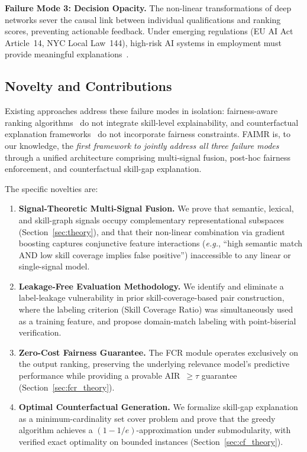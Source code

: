 \documentclass{svproc}
\begin{document}
\textbf{Failure Mode 3: Decision Opacity.} The non-linear transformations of deep networks sever the causal link between individual qualifications and ranking scores, preventing actionable feedback. Under emerging regulations (EU AI Act Article~14, NYC Local Law~144), high-risk AI systems in employment must provide meaningful explanations~\cite{wachter2017counterfactual}.

\subsection{Novelty and Contributions}

Existing approaches address these failure modes in isolation: fairness-aware ranking algorithms~\cite{zehlike2017fa} do not integrate skill-level explainability, and counterfactual explanation frameworks~\cite{mothilal2020dice} do not incorporate fairness constraints. FAIMR is, to our knowledge, the \textit{first framework to jointly address all three failure modes} through a unified architecture comprising multi-signal fusion, post-hoc fairness enforcement, and counterfactual skill-gap explanation.

The specific novelties are:

\begin{enumerate}
    \item \textbf{Signal-Theoretic Multi-Signal Fusion.} We prove that semantic, lexical, and skill-graph signals occupy complementary representational subspaces (Section~\ref{sec:theory}), and that their non-linear combination via gradient boosting captures conjunctive feature interactions (\textit{e.g.}, ``high semantic match AND low skill coverage implies false positive'') inaccessible to any linear or single-signal model.

    \item \textbf{Leakage-Free Evaluation Methodology.} We identify and eliminate a label-leakage vulnerability in prior skill-coverage-based pair construction, where the labeling criterion (Skill Coverage Ratio) was simultaneously used as a training feature, and propose domain-match labeling with point-biserial verification.

    \item \textbf{Zero-Cost Fairness Guarantee.} The FCR module operates exclusively on the output ranking, preserving the underlying relevance model's predictive performance while providing a provable AIR~$\geq \tau$ guarantee (Section~\ref{sec:fcr_theory}).

    \item \textbf{Optimal Counterfactual Generation.} We formalize skill-gap explanation as a minimum-cardinality set cover problem and prove that the greedy algorithm achieves a $(1 - 1/e)$-approximation under submodularity, with verified exact optimality on bounded instances (Section~\ref{sec:cf_theory}).
\end{enumerate}
\end{document}
